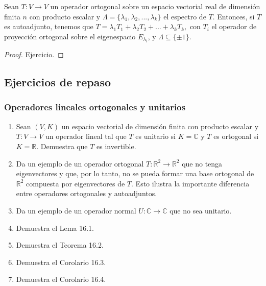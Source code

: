 \documentclass[12pt,dvipsnames]{article}
\newenvironment{corolario}[2][Corolario]{\begin{trivlist}
\item[\hskip \labelsep {\bfseries #1}\hskip \labelsep {\bfseries #2.}]}{\end{trivlist}}
\begin{document}
\begin{corolario} {16.4}
    Sean $T:V\to V$ un operador ortogonal sobre un espacio vectorial real de dimensión finita $n$ con producto escalar y $\Lambda=\{\lambda_1,\lambda_2,... , \lambda_k\}$ el espectro de $T$. Entonces, si $T$ es autoadjunto, tenemos que $T = \lambda_1 T_1 + \lambda_2 T_2 + ... + \lambda_k T_k,$ con $T_i$ el operador de proyección ortogonal sobre el eigenespacio $E_{\lambda_i}$, y $\Lambda\subseteq\{\pm 1\}$.

    \begin{proof}
        Ejercicio.
    \end{proof}
       
\end{corolario}

\subsection{Ejercicios de repaso}

\subsubsection{Operadores lineales ortogonales y unitarios}

\begin{enumerate}
    \item Sean $(V,K)$ un espacio vectorial de dimensión finita con producto escalar y $T:V\to V$ un operador lineal tal que $T$ es unitario si $K=\mathbb{C}$ y $T$ es ortogonal si $K=\mathbb{R}$. Demuestra que $T$ es invertible.
    \item Da un ejemplo de un operador ortogonal $T:\mathbb{R}^2\to \mathbb{R}^2$ que no tenga eigenvectores y que, por lo tanto, no se pueda formar una base ortogonal de $\mathbb{R}^2$ compuesta por eigenvectores de $T$. Esto ilustra la importante diferencia entre operadores ortogonales y autoadjuntos.
    \item Da un ejemplo de un operador normal $U:\mathbb{C}\to \mathbb{C}$ que no sea unitario.
    \item Demuestra el Lema 16.1.
    \item Demuestra el Teorema 16.2.
    \item Demuestra el Corolario 16.3.
    \item Demuestra el Corolario 16.4.
\end{enumerate}
\end{document}

